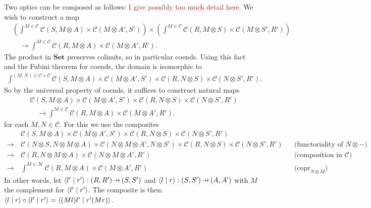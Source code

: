 \documentclass[11pt,a4paper]{article}
\theoremstyle{plain}
\theoremstyle{definition}
\newcommand{\C}{\mathscr{C}}
\newcommand{\M}{\mathscr{M}}
\newcommand{\Set}{\mathbf{Set}}
\DeclareMathOperator{\copr}{copr}
\newcommand{\rep}[2]{{\ensuremath \left\langle #1 \mid #2 \right\rangle}}
\newcommand{\hto}{\ensuremath{\,\mathaccent\shortmid\rightarrow\,}}
\newcommand{\todo}[1]{\textcolor{red}{\small #1}}
\begin{document}
Two optics can be composed as follows: \todo{I give possibly too much detail here.} We wish to construct a map
\begin{align*}
  &\left(\int^{M \in \C} \C(S, M \otimes A) \times \C(M \otimes A', S')\right) \times \left(\int^{M \in \C} \C(R, M \otimes S) \times \C(M \otimes S', R')\right) \\ &
                                                                                                                                                                       \quad \to \int^{M \in \C} \C(R, M \otimes A) \times \C(M \otimes A', R').
\end{align*}
The product in $\Set$ preserves colimits, so in particular coends. Using this fact and the Fubini theorem for coends, the domain is isomorphic to
\begin{align*}
  \int^{(M, N) \in \C \times \C} \C(S, M \otimes A) \times \C(M \otimes A', S') \times \C(R, N \otimes S) \times \C(N \otimes S', R').
\end{align*}
So by the universal property of coends, it suffices to construct natural maps
\begin{align*}
  & \C(S, M \otimes A) \times \C(M \otimes A', S') \times \C(R, N \otimes S) \times \C(N \otimes S', R') \\ &
                                                                                                              \quad \to \int^{M \in \C} \C(R, M \otimes A) \times \C(M \otimes A', R').
\end{align*}
for each $M, N \in \C$. For this we use the composites
\begin{align*}
  &\C(S, M \otimes A) \times \C(M \otimes A', S') \times \C(R, N \otimes S) \times \C(N \otimes S', R')\\
  \to \,& \C(N \otimes S, N \otimes M \otimes A) \times \C(N \otimes M \otimes A', N \otimes S') \times \C(R, N \otimes S) \times \C(N \otimes S', R') && \text{(functoriality of $N \otimes  -$)} \\
  \to \,& \C(R, N \otimes  M \otimes A) \times \C(N \otimes M \otimes A', R') && \text{(composition in $\C$)} \\
  \to \,&\int^{M \in \M} \C(R, M \otimes A) \times \C(M \otimes A', R') && \text{($\copr_{N \otimes M}$)}
\end{align*}
In other words, let $\rep{l'}{r'} : (R, R') \hto (S, S')$ and $\rep{l}{r} : (S, S') \hto (A, A')$ with $M$ the complement for $\rep{l'}{r'}$. The composite is then: $\rep{l}{r} \circ \rep{l'}{r'} = \rep{(M l)l'}{r'(Mr)}$.
\end{document}
